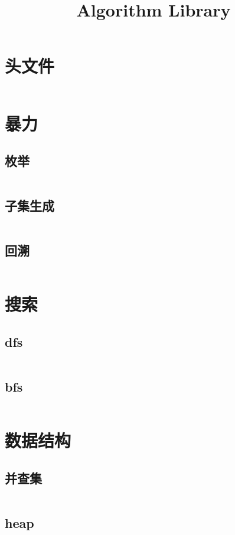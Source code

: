 \documentclass[a4paper,11pt]{article}
\author{}
\title{Algorithm Library}
\begin{document}
 
\maketitle %
\newpage %
\tableofcontents %
\newpage

\section{头文件}
\inputminted[breaklines]{c++}{pre/pre.cpp}

\section{暴力}
\subsection{枚举}
\inputminted[breaklines]{c++}{violence/permutation.cpp}
\subsection{子集生成}
\inputminted[breaklines]{c++}{violence/subset.cpp}
\subsection{回溯}
\inputminted[breaklines]{c++}{violence/backtracking.cpp}


\section{搜索}

\subsection{dfs}
\inputminted[breaklines]{c++}{search/dfs.cpp}
\subsection{bfs}
\inputminted[breaklines]{c++}{search/bfs.cpp}


\section{数据结构}
\subsection{并查集}
\inputminted[breaklines]{c++}{ds/unionfind.h}
\subsection{heap}
\inputminted[breaklines]{c++}{ds/heap.cpp}
\end{document}
